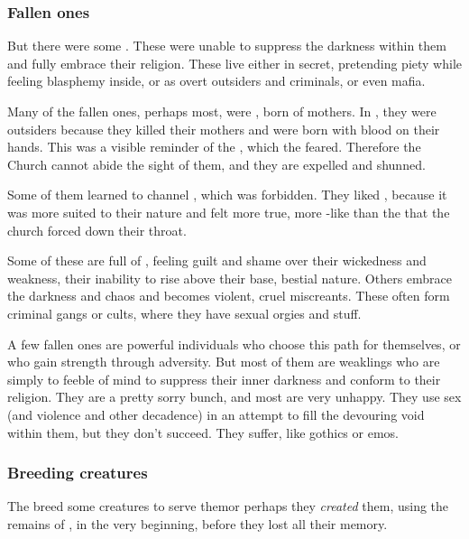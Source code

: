 \subsubsection{Fallen ones}
But there were some  \resphain. These were unable to suppress the darkness within them and fully embrace their religion. These live either in secret, pretending piety while feeling blasphemy inside, or as overt outsiders and criminals, or even mafia. 

Many of the fallen ones, perhaps most, were , born of \human{} mothers. In \Merkyrah, they were outsiders because they killed their mothers and were born with blood on their hands. This was a visible reminder of the \resphan{} , which the \Merkyrans{} feared. Therefore the Church cannot abide the sight of them, and they are expelled and shunned. 

Some of them learned to channel , which was forbidden. They liked \nieur, because it was more suited to their nature and felt more true, more \resphan-like than the  that the church forced down their throat.

Some of these are full of , feeling guilt and shame over their wickedness and weakness, their inability to rise above their base, bestial nature. Others embrace the darkness and chaos and becomes violent, cruel miscreants. These often form criminal gangs or cults, where they have sexual orgies and stuff. 

A few fallen ones are powerful individuals who choose this path for themselves, or who gain strength through adversity. But most of them are weaklings who are simply to feeble of mind to suppress their inner darkness and conform to their religion. They are a pretty sorry bunch, and most are very unhappy. They use sex (and violence and other decadence) in an attempt to fill the devouring void within them, but they don't succeed. They suffer, like gothics or emos. 





\subsubsection{Breeding creatures}
The \Merkyrans{} breed some creatures to serve them\dash or perhaps they \emph{created} them, using the remains of , in the very beginning, before they lost all their memory. 

